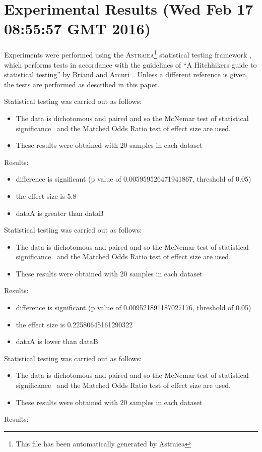 \documentclass[]{article}
\begin{document}
\section{Experimental Results (Wed Feb 17 08:55:57 GMT 2016)}
Experiments were performed using the \textsc{Astraiea}\footnote{This file has been automatically generated by Astraiea} statistical testing framework \cite{Neumann:2014:EET:2598394.2609850},
which performs tests in accordance with the guidelines of ``A Hitchhikers guide to statistical testing''
by Briand and Arcuri~\cite{Arcuri2012}.
Unless a different reference is given, the tests are performed as described in this paper.

Statistical testing was carried out as follows: \begin{itemize}
\item{The data is dichotomous and paired and so the McNemar test of statistical significance~\cite{Gibbons2011} and the Matched Odds Ratio test of effect size are used.}
\item{These results were obtained with 20 samples in each dataset}
\end{itemize}Results:
\begin{itemize}
\item{difference is significant (p value of 0.005959526471941867, threshold of 0.05)}
\item{the effect size is 5.8}
\item{dataA is greater than dataB}
\end{itemize}Statistical testing was carried out as follows: \begin{itemize}
\item{The data is dichotomous and paired and so the McNemar test of statistical significance~\cite{Gibbons2011} and the Matched Odds Ratio test of effect size are used.}
\item{These results were obtained with 20 samples in each dataset}
\end{itemize}Results:
\begin{itemize}
\item{difference is significant (p value of 0.009521891187027176, threshold of 0.05)}
\item{the effect size is 0.22580645161290322}
\item{dataA is lower than dataB}
\end{itemize}Statistical testing was carried out as follows: \begin{itemize}
\item{The data is dichotomous and paired and so the McNemar test of statistical significance~\cite{Gibbons2011} and the Matched Odds Ratio test of effect size are used.}
\item{These results were obtained with 20 samples in each dataset}
\end{itemize}Results:
\end{document}
